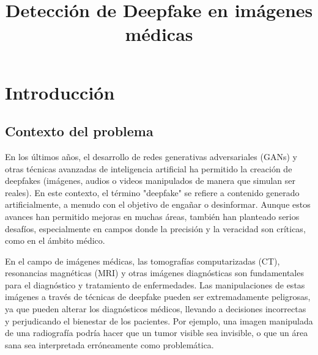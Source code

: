 \documentclass[conference]{IEEEtran}
\begin{document}
\title{Detección de Deepfake en imágenes médicas\\}

\author{
\and
{}
\and
{}

}

\maketitle

\section{Introducción}
\subsection{Contexto del problema}

En los últimos años, el desarrollo de redes generativas adversariales (GANs) y otras técnicas avanzadas de inteligencia artificial ha permitido la creación de deepfakes (imágenes, audios o videos manipulados de manera que simulan ser reales). En este contexto, el término "deepfake" se refiere a contenido generado artificialmente, a menudo con el objetivo de engañar o desinformar. Aunque estos avances han permitido mejoras en muchas áreas, también han planteado serios desafíos, especialmente en campos donde la precisión y la veracidad son críticas, como en el ámbito médico.

En el campo de imágenes médicas, las tomografías computarizadas (CT), resonancias magnéticas (MRI) y otras imágenes diagnósticas son fundamentales para el diagnóstico y tratamiento de enfermedades. Las manipulaciones de estas imágenes a través de técnicas de deepfake pueden ser extremadamente peligrosas, ya que pueden alterar los diagnósticos médicos, llevando a decisiones incorrectas y perjudicando el bienestar de los pacientes. Por ejemplo, una imagen manipulada de una radiografía podría hacer que un tumor visible sea invisible, o que un área sana sea interpretada erróneamente como problemática.
\end{document}
